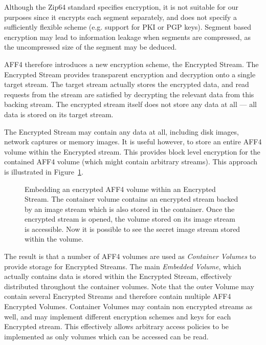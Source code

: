 \documentclass[10pt, conference]{IEEEtran}
\begin{document}
Although the Zip64 standard specifies encryption, it is not suitable
for our purposes since it encrypts each segment separately, and does
not specify a sufficiently flexible scheme (e.g. support for PKI or
PGP keys). Segment based encryption may lead to information leakage
when segments are compressed, as the uncompressed size of the segment
may be deduced.

AFF4 therefore introduces a new encryption scheme, the Encrypted
Stream.  The Encrypted Stream provides transparent encryption and
decryption onto a single target stream. The target stream actually
stores the encrypted data, and read requests from the stream are
satisfied by decrypting the relevant data from this backing
stream. The encrypted stream itself does not store any data at all ---
all data is stored on its target stream.

The Encrypted Stream may contain any data at all, including disk
images, network captures or memory images. It is useful however, to
store an entire AFF4 volume within the Encrypted stream. This provides
block level encryption for the contained AFF4 volume (which might
contain arbitrary streams). This approach is illustrated in
Figure~\ref{crypted_fif}.

\begin{figure}[tb]
  \begin{center}
  \mbox{\columnwidth {}}

  \caption{Embedding an encrypted AFF4 volume within an Encrypted
  Stream. The container volume contains an encrypted stream backed by
  an image stream which is also stored in the container. Once the
  encrypted stream is opened, the volume stored on its image stream is
  accessible. Now it is possible to see the secret image stream stored
  within the volume.}

  \label{crypted_fif}
  \end{center}
\end{figure}

The result is that a number of AFF4 volumes are used as {\em Container
Volumes} to provide storage for Encrypted Streams. The main {\em
Embedded Volume}, which actually contains data is stored within the
Encrypted Stream, effectively distributed throughout the container
volumes. Note that the outer Volume may contain several Encrypted
Streams and therefore contain multiple AFF4 Encrypted
Volumes. Container Volumes may contain non encrypted streams as well,
and may implement different encryption schemes and keys for each
Encrypted stream. This effectively allows arbitrary access policies to
be implemented as only volumes which can be accessed can be read.
\end{document}
